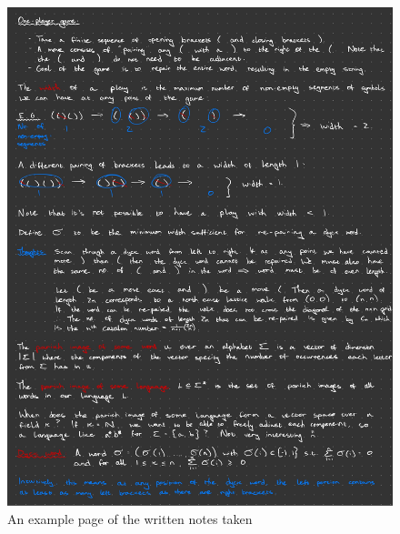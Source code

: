 \begin{figure}[H]
    \centering
    \includegraphics[scale=0.227]{./images/notesExample.jpg}
    \caption{An example page of the written notes taken}
\end{figure}